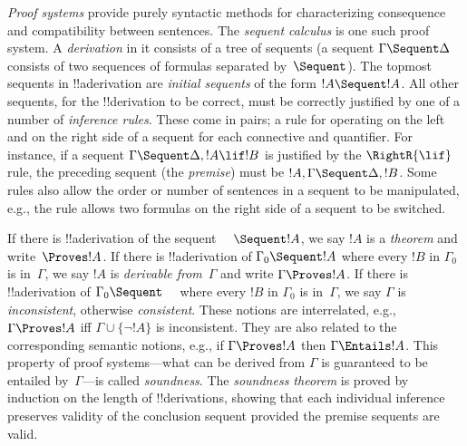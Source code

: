 \emph{Proof systems} provide purely syntactic methods for
characterizing consequence and compatibility between sentences.
The \emph{sequent calculus} is one such proof
system. A \emph{derivation} in it consists of a tree of sequents (a
sequent $\Gamma \Sequent \Delta$ consists of two sequences of formulas
separated by~$\Sequent$). The topmost sequents in !!a{derivation}
are \emph{initial sequents} of the form $!A \Sequent !A$.  All other
sequents, for the !!{derivation} to be correct, must be correctly
justified by one of a number of \emph{inference rules}. These come in
pairs; a rule for operating on the left and on the right side of a
sequent for each connective and quantifier. For instance, if a sequent
$\Gamma \Sequent \Delta, !A \lif !B$ is justified by the
$\RightR{\lif}$ rule, the preceding sequent (the \emph{premise}) must
be $!A, \Gamma \Sequent \Delta, !B$. Some rules also allow the order
or number of sentences in a sequent to be manipulated, e.g.,
the \RightR{\Exchange} rule allows two formulas on the right side of a
sequent to be switched.

If there is !!a{derivation} of the sequent $\quad \Sequent !A$, we say
$!A$ is a \emph{theorem} and write~$\Proves !A$. If there is
!!a{derivation} of $\Gamma_0 \Sequent !A$ where every $!B$ in $\Gamma_0$ is
in~$\Gamma$, we say $!A$ is \emph{derivable from}~$\Gamma$ and write
$\Gamma \Proves !A$. If there is !!a{derivation} of
$\Gamma_0 \Sequent \quad$ where every $!B$ in $\Gamma_0$ is
in~$\Gamma$, we say $\Gamma$ is \emph{inconsistent}, otherwise
\emph{consistent}. These notions are interrelated, e.g., $\Gamma
\Proves !A$ iff $\Gamma \cup \{\lnot !A\}$ is inconsistent. They are
also related to the corresponding semantic notions, e.g., if $\Gamma
\Proves !A$ then $\Gamma \Entails !A$. This property of proof
systems---what can be derived from $\Gamma$ is guaranteed to be
entailed by~$\Gamma$---is called \emph{soundness}. The \emph{soundness
theorem} is proved by induction on the length of !!{derivation}s, showing
that each individual inference preserves validity of the conclusion
sequent provided the premise sequents are valid.
